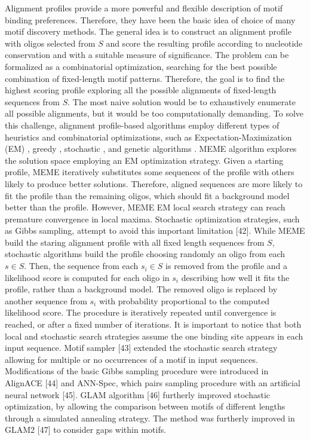 \documentclass[a4paper, titlepage, openright]{book}
\begin{document}
Alignment profiles provide a more powerful and flexible description of motif binding preferences. Therefore, they have been the basic idea of choice of many motif discovery methods. The general idea is to construct an alignment profile with oligos selected from $S$ and score the resulting profile according to nucleotide conservation and with a suitable measure of significance. The problem can be formalized as a combinatorial optimization, searching for the best possible combination of fixed-length motif patterns. Therefore, the goal is to find the highest scoring profile exploring all the possible alignments of fixed-length sequences from $S$. The most naive solution would be to
exhaustively enumerate all possible alignments, but it would be too computationally demanding. To solve this challenge, alignment profile-based algorithms employ different types of heuristics and combinatorial optimizations, such as Expectation-Maximization (EM) \citep{bailey1995unsupervised}, greedy \citep{hertz1999identifying}, stochastic \citep{lawrence1993detecting}, and genetic algorithms \citep{lee2018comprehensive}. MEME algorithm \citep{bailey1994fitting,bailey1995value,bailey2006meme} explores the solution space employing an EM optimization strategy. Given a starting profile, MEME iteratively substitutes some sequences of the profile with others likely to produce better solutions. Therefore, aligned sequences are more likely to fit the profile than the remaining oligos, which should fit a background model better than the profile. However, MEME EM local search strategy can reach premature convergence in local maxima. Stochastic optimization strategies, such as Gibbs sampling, attempt to avoid this important limitation [42]. While MEME build the staring alignment profile with all fixed length sequences from $S$, stochastic algorithms build the profile choosing randomly an oligo from each $s \in S$. Then, the sequence from each $s_{i} \in S$ is removed from the profile and a likelihood score is computed for each oligo in $s_{i}$ describing how well it fits the profile, rather than a background model. The removed oligo is replaced by another sequence from $s_{i}$ with probability proportional to the computed likelihood score. The procedure is iteratively repeated until convergence is reached, or after a fixed number of iterations. It is important to notice that both local and stochastic search strategies assume the one binding site appears in each input sequence. Motif sampler [43] extended the stochastic search strategy allowing for multiple or no occurrences of a motif in input sequences. Modifications of the basic Gibbs sampling procedure were introduced in AlignACE [44] and ANN-Spec, which pairs sampling procedure with an artificial neural network [45]. GLAM algorithm [46] furtherly improved stochastic optimization, by allowing the comparison between motifs of different lengths through a simulated annealing strategy. The method was furtherly improved in GLAM2 [47] to consider gaps within motifs.






\end{document}
